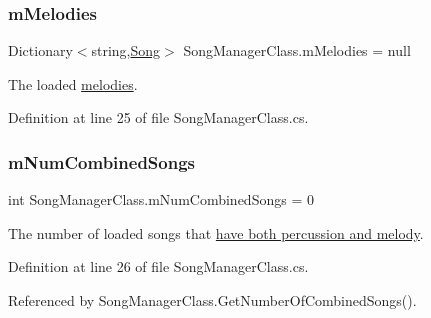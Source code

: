 \mbox{\label{group___s_m_priv_var_ga935e80f645d0546003f7df8443b79242}} 
\subsubsection{\texorpdfstring{m\+Melodies}{mMelodies}}
{\footnotesize\ttfamily Dictionary$<$string,\hyperlink{class_song}{Song}$>$ Song\+Manager\+Class.\+m\+Melodies = null\hspace{0.3cm}{\ttfamily [private]}}



The loaded \hyperlink{group___song_group_DocSongMelody}{melodies}. 



Definition at line 25 of file Song\+Manager\+Class.\+cs.

\mbox{\label{group___s_m_priv_var_gae423c7b9efd0e2ef721820318200e5f9}} 
\subsubsection{\texorpdfstring{m\+Num\+Combined\+Songs}{mNumCombinedSongs}}
{\footnotesize\ttfamily int Song\+Manager\+Class.\+m\+Num\+Combined\+Songs = 0\hspace{0.3cm}{\ttfamily [private]}}



The number of loaded songs that \hyperlink{group___song_group_DocSongCombined}{have both percussion and melody}. 



Definition at line 26 of file Song\+Manager\+Class.\+cs.



Referenced by Song\+Manager\+Class.\+Get\+Number\+Of\+Combined\+Songs().

\mbox{\label{group___s_m_priv_var_ga0ea9b6c8343a9b2cbe0eb375edaef247}} 
